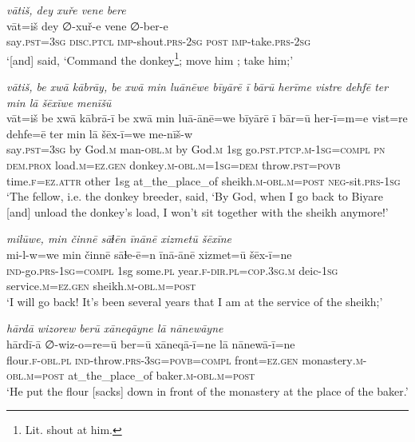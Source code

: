 \ea \label{HB.62}
\textit{vātiš, dey xuře vene bere} \\ 
\gll vāt=iš dey ∅-xuř-e vene ∅-ber-e \\ 
 say\textsc{.pst}\textsc{=3sg} \textsc{disc.ptcl} \textsc{imp-}shout\textsc{.prs}-\textsc{2sg} \textsc{post} \textsc{imp-}take\textsc{.prs}-\textsc{2sg} \\ 
\glt `[and] said, ‘Command the donkey\footnote{Lit. shout at him.}; move him ; take him;'
\z 
 
\ea \label{HB.67}
\textit{vātiš, be xwā kābrāy, be xwā min luānēwe bīyārē ī bārū herīme vistre dehfē ter min lā šēxīwe menīšū} \\ 
\gll vāt=iš be xwā kābrā-ī be xwā min luā-ānē=we bīyārē ī bār=ū her-ī=m=e vist=re dehfe=ē ter min lā šēx-ī=we me-nīš-w \\ 
 say\textsc{.pst}\textsc{=3sg} by God\textsc{.m} man\textsc{-obl}\textsc{.m} by God\textsc{.m} 1sg go\textsc{.pst}\textsc{.ptcp}\textsc{.m}\textsc{-1sg}\textsc{=\textsc{compl}} \textsc{pn} \textsc{dem.prox} load\textsc{.m}\textsc{=ez}\textsc{.gen} donkey\textsc{.m}\textsc{-obl}\textsc{.m}\textsc{=1sg}\textsc{=dem} throw\textsc{.pst}\textsc{=\textsc{povb}} time\textsc{\textsc{.f}}\textsc{=ez}.\textsc{attr} other 1sg at\_the\_place\_of sheikh\textsc{.m}\textsc{-obl}\textsc{.m}\textsc{=\textsc{post}} \textsc{neg-}sit\textsc{.prs}\textsc{-1sg} \\ 
\glt `The fellow, i.e. the donkey breeder, said, ‘By God, when I go back to Biyare [and] unload the donkey’s load, I won’t sit together with the sheikh anymore!'
\z 
 
\ea \label{HB.68}
\textit{milūwe, min činnē sāɫēn īnānē xizmetū šēxīne} \\ 
\gll mi-l-w=we min činnē sāɫe-ē=n īnā-ānē xizmet=ū šēx-ī=ne \\ 
 \textsc{ind-}go\textsc{.prs}\textsc{-1sg}\textsc{=\textsc{compl}} 1sg some\textsc{.pl} year\textsc{\textsc{.f}}\textsc{-dir}\textsc{.pl}\textsc{=cop}\textsc{.3sg}\textsc{.m} deic\textsc{-1sg} service\textsc{.m}\textsc{=ez}\textsc{.gen} sheikh\textsc{.m}\textsc{-obl}\textsc{.m}\textsc{=\textsc{post}} \\ 
\glt `I will go back! It’s been several years that I am at the service of the sheikh;'
\z 
 
\ea \label{HB.73}
\textit{hārdā wizorew berū xāneqāyne lā nānewāyne} \\ 
\gll hārdī-ā ∅-wiz-o=re=ū ber=ū xāneqā-ī=ne lā nānewā-ī=ne \\ 
 flour\textsc{\textsc{.f}}\textsc{-obl}\textsc{.pl} \textsc{ind-}throw\textsc{.prs}\textsc{-3sg}\textsc{=\textsc{povb}}=\textsc{compl} front\textsc{=ez}\textsc{.gen} monastery\textsc{.m}\textsc{-obl}\textsc{.m}\textsc{=\textsc{post}} at\_the\_place\_of baker\textsc{.m}\textsc{-obl}\textsc{.m}\textsc{=\textsc{post}} \\ 
\glt `He put the flour [sacks] down in front of the monastery at the place of the baker.'
\z 
 
